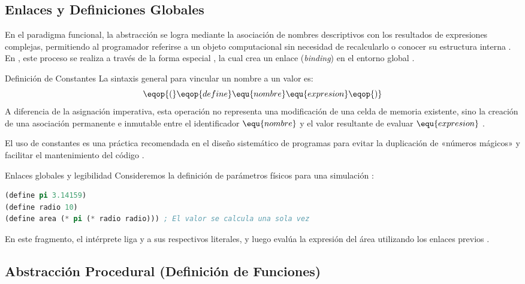 \subsection{Enlaces y Definiciones Globales}
\label{subsec:4_2_3_enlaces}

En el paradigma funcional, la abstracción se logra mediante la asociación de nombres descriptivos con los resultados de expresiones complejas, permitiendo al programador referirse a un objeto computacional sin necesidad de recalcularlo o conocer su estructura interna \cite{SICP}. En , este proceso se realiza a través de la forma especial , la cual crea un enlace (\textit{binding}) en el entorno global \cite{SICP, HtDP}.

\begin{definicion}{Definición de Constantes}
La sintaxis general para vincular un nombre a un valor es:
\begin{equation}
    \eqop{(}\eqop{define} \equ{nombre} \equ{expresion}\eqop{)}
\end{equation}
A diferencia de la asignación imperativa, esta operación no representa una modificación de una celda de memoria existente, sino la creación de una asociación permanente e inmutable entre el identificador $\equ{nombre}$ y el valor resultante de evaluar $\equ{expresion}$ \cite{SICP, HtDP}.
\end{definicion}

El uso de constantes es una práctica recomendada en el diseño sistemático de programas para evitar la duplicación de «números mágicos» y facilitar el mantenimiento del código \cite{HtDP}. 

\begin{ejemplo}{Enlaces globales y legibilidad}
Consideremos la definición de parámetros físicos para una simulación \cite{HtDP}:
\begin{lstlisting}[language=Lisp, caption={Definiciones de constantes en Scheme}]
(define pi 3.14159)
(define radio 10)
(define area (* pi (* radio radio))) ; El valor se calcula una sola vez
\end{lstlisting}
En este fragmento, el intérprete liga  y  a sus respectivos literales, y luego evalúa la expresión del área utilizando los enlaces previos \cite{SICP}.
\end{ejemplo}

\subsection*{Abstracción Procedural (Definición de Funciones)}

